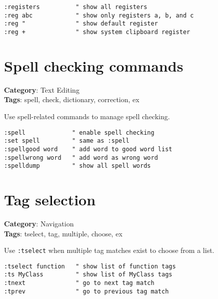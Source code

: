 {{{{{{\begin{Exa*}{}
\begin{Verbatim}[fontsize=\footnotesize, breaklines, breakanywhere]
:registers          " show all registers
:reg abc            " show only registers a, b, and c
:reg "              " show default register
:reg +              " show system clipboard register
\end{Verbatim}
\end{Exa*}

\section{Spell checking commands}

\textbf{Category}: Text Editing\\ \textbf{Tags}: spell, check, dictionary, correction, ex
\vspace{0.5cm}

Use spell-related commands to manage spell checking.

\begin{Exa*}{}
\begin{Verbatim}[fontsize=\footnotesize, breaklines, breakanywhere]
:spell             " enable spell checking
:set spell         " same as :spell
:spellgood word    " add word to good word list
:spellwrong word   " add word as wrong word
:spelldump         " show all spell words
\end{Verbatim}
\end{Exa*}

\section{Tag selection}

\textbf{Category}: Navigation\\ \textbf{Tags}: tselect, tag, multiple, choose, ex
\vspace{0.5cm}

Use {\footnotesize \Verb§:tselect§} when multiple tag matches exist to choose from a list.

\begin{Exa*}{}
\begin{Verbatim}[fontsize=\footnotesize, breaklines, breakanywhere]
:tselect function   " show list of function tags
:ts MyClass         " show list of MyClass tags
:tnext              " go to next tag match
:tprev              " go to previous tag match
\end{Verbatim}
\end{Exa*}

}}}}}}
